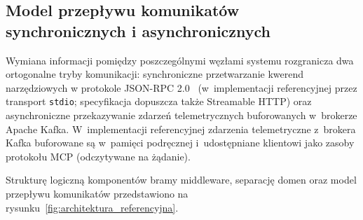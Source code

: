 \subsection{Model przepływu komunikatów synchronicznych i asynchronicznych}
\label{subsec:projekt_przeplyw_komunikatow}

Wymiana informacji pomiędzy poszczególnymi węzłami systemu rozgranicza dwa ortogonalne tryby komunikacji: synchroniczne przetwarzanie kwerend narzędziowych w protokole JSON-RPC 2.0~\cite{jsonrpc2010,rfc8259} (w~implementacji referencyjnej przez transport \texttt{stdio}; specyfikacja dopuszcza także Streamable HTTP) oraz asynchroniczne przekazywanie zdarzeń telemetrycznych buforowanych w~brokerze Apache Kafka. W~implementacji referencyjnej zdarzenia telemetryczne z~brokera Kafka buforowane są w~pamięci podręcznej i~udostępniane klientowi jako zasoby protokołu MCP (odczytywane na żądanie).

Strukturę logiczną komponentów bramy middleware, separację domen oraz model przepływu komunikatów przedstawiono na rysunku~\ref{fig:architektura_referencyjna}.

